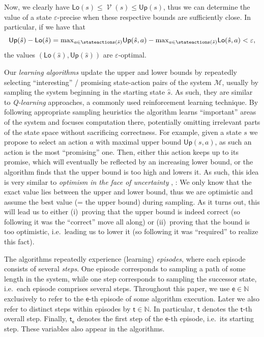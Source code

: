 \documentclass{article}
\newcommand{\Naturals}{\mathbb{N}}
\newcommand{\MDP}{\mathcal{M}}
\newcommand{\initialstate}{\hat{s}}
\DeclareMathOperator{\val}{\mathcal{V}}
\newcommand{\upperbound}{\mathsf{Up}}
\newcommand{\lowerbound}{\mathsf{Lo}}
\newcommand{\algostep}{\mathsf{t}}
\newcommand{\algoepisode}{\mathsf{e}}
\begin{document}
Now, we clearly have  $\lowerbound(s) \leq \val(s) \leq \upperbound(s)$, thus we can determine the value of a state $\varepsilon$-precise when these respective bounds are sufficiently close.
In particular, if we have that
\begin{equation*}
	\upperbound(\initialstate) - \lowerbound(\initialstate) = {\max}_{a \in \stateactions(\initialstate)} \upperbound(\initialstate, a) - {\max}_{a \in \stateactions(\initialstate)} \lowerbound(\initialstate, a) < \varepsilon,
\end{equation*}
the values $(\lowerbound(\initialstate), \upperbound(\initialstate))$ are $\varepsilon$-optimal.

Our \emph{learning algorithms} update the upper and lower bounds by repeatedly selecting \enquote{interesting} / promising state-action pairs of the system $\MDP$, usually by sampling the system beginning in the starting state $\initialstate$.
As such, they are similar to \emph{Q-learning} \cite{watkins1992q} approaches, a commonly used reinforcement learning technique.
By following appropriate sampling heuristics the algorithm learns \enquote{important} areas of the system and focuses computation there, potentially omitting irrelevant parts of the state space without sacrificing correctness.
For example, given a state $s$ we propose to select an action $a$ with maximal upper bound $\upperbound(s, a)$, as such an action is the most \enquote{promising} one.
Then, either this action keeps up to its promise, which will eventually be reflected by an increasing lower bound, or the algorithm finds that the upper bound is too high and lowers it.
As such, this idea is very similar to \emph{optimism in the face of uncertainty} \cite[Section~4.2]{DBLP:series/synthesis/2010Szepesvari}, \cite{lai1985asymptotically}:
We only know that the exact value lies between the upper and lower bound, thus we are optimistic and assume the best value (= the upper bound) during sampling.
As it turns out, this will lead us to either (i)~proving that the upper bound is indeed correct (so following it was the \enquote{correct} move all along) or (ii)~proving that the bound is too optimistic, i.e.\ leading us to lower it (so following it was \enquote{required} to realize this fact).

The algorithms repeatedly experience (learning) \emph{episodes}, where each episode consists of several \emph{steps}.
One episode corresponds to sampling a path of some length in the system, while one step corresponds to sampling the successor state, i.e.\ each episode comprises several steps.
Throughout this paper, we use $\algoepisode \in \Naturals$ exclusively to refer to the $\algoepisode$-th episode of some algorithm execution.
Later we also refer to distinct steps within episodes by $\algostep \in \Naturals$.
In particular, $\algostep$ denotes the $\algostep$-th overall step.
Finally, $\algostep_\algoepisode$ denotes the first step of the $\algoepisode$-th episode, i.e.\ its starting step.
These variables also appear in the algorithms.
\end{document}
